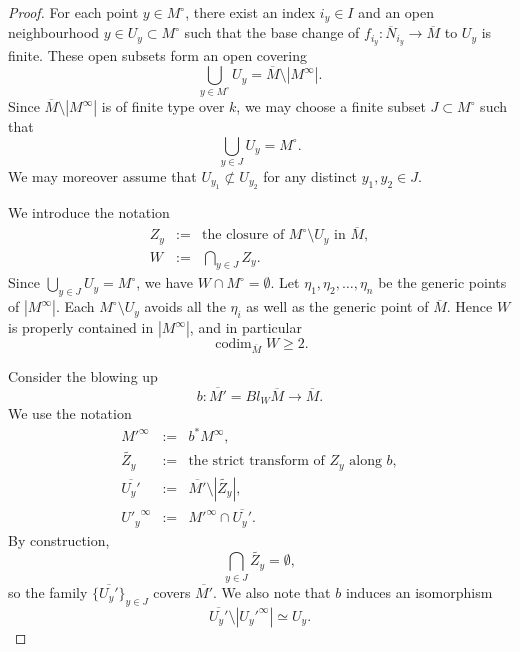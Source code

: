 \documentclass[10pt,a4paper]{amsart}
\theoremstyle{plain}
\newcommand{\ol}{\overline}
\newcommand{\codim}{{\operatorname{codim}}}
\def\Minf{M^{\infty}}
\begin{document}
\begin{proof}
For each point $y \in  M^\circ$, there exist an index ${i_y}\in I$ and an open neighbourhood $y \in U_y \subset  M^\circ$ such that the base change of $f_{i_y}:\ol{N}_{i_y} \to \ol{M}$ to $U_y$ is finite. These open subsets form an open covering
\[
\bigcup_{y \in M^\circ} U_y=\ol{M}\setminus |M^\infty|.
\]
Since $\ol{M}\setminus |M^\infty|$ is of finite type over $k$, we may choose a finite subset $J \subset  M^\circ$ such that
\[
\bigcup_{y \in J} U_y= M^\circ.
\]
We may moreover assume that $U_{y_1}\not\subset U_{y_2}$ for any distinct $y_1,y_2\in J$.

We introduce the notation
\begin{eqnarray*}
Z_y&:=&\text{the closure of }M^\circ \setminus U_y \text{ in }\ol{M},\\
W&:=&\bigcap_{y \in J} Z_y.
\end{eqnarray*}
Since $\bigcup_{y\in J}U_y=M^\circ$, we have $W \cap M^\circ=\emptyset$. Let $\eta_1,\eta_2,\dots,\eta_n$ be the generic points of $|\Minf|$. Each $M^\circ\setminus U_y$ avoids all the $\eta_i$ as well as the generic point of $\ol{M}$. Hence $W$ is properly contained in $|M^\infty|$, and in particular
\[
\codim_{\ol{M}}W \geq 2.
\]

Consider the blowing up
\[
b:\ol{M'}=Bl_{W}\ol{M} \to \ol{M}.
\]
We use the notation
\begin{eqnarray*}
{M'}^\infty&:=& b^*M^\infty,\\
\widetilde{Z_y}&:=&\text{the strict transform of }Z_y\text{ along }b,\\
\ol{U_y'}&:=&\ol{M'}\setminus |\widetilde{Z_y}|,\\
{U'_y}^\infty&:=&{M'}^\infty \cap \ol{U_y'}.
\end{eqnarray*}
By construction,
\[
\bigcap_{y\in J}\widetilde{Z_y}=\emptyset,
\]
so the family $\{\ol{U_y'}\}_{y\in J}$ covers $\ol{M'}$. We also note that $b$ induces an isomorphism
\[
\ol{U_y'}\setminus |{U_y'}^\infty| \simeq U_y.
\]


\end{proof}
\end{document}

